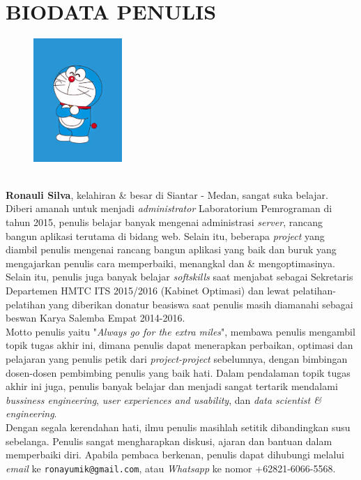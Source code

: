 \chapter{BIODATA PENULIS}
		\begin{figure}
			\includegraphics[width=0.3\textwidth]{images/foto-diri.jpg}
		\end{figure}
		\textbf{\ \\Ronauli Silva}, kelahiran \& besar di Siantar - Medan, sangat suka belajar. Diberi amanah untuk menjadi \textit{administrator} Laboratorium Pemrograman di tahun 2015, penulis belajar banyak mengenai administrasi \textit{server}, rancang bangun aplikasi terutama di bidang web. Selain itu, beberapa \textit{project} yang diambil penulis mengenai rancang bangun aplikasi yang baik dan buruk yang mengajarkan penulis cara memperbaiki, menangkal dan \& mengoptimasinya.\\
		Selain itu, penulis juga banyak belajar \textit{softskills} saat menjabat sebagai Sekretaris Departemen HMTC ITS 2015/2016 (Kabinet Optimasi) dan lewat pelatihan-pelatihan yang diberikan donatur beasiswa saat penulis masih diamanahi sebagai beswan Karya Salemba Empat 2014-2016.\\
		\indent Motto penulis yaitu "\textit{Always go for the extra miles}", membawa penulis mengambil topik tugas akhir ini, dimana penulis dapat menerapkan perbaikan, optimasi dan pelajaran yang penulis petik dari \textit{project-project} sebelumnya, dengan bimbingan dosen-dosen pembimbing penulis yang baik hati. Dalam pendalaman topik tugas akhir ini juga, penulis banyak belajar dan menjadi sangat tertarik mendalami \textit{bussiness engineering}, \textit{user experiences and usability}, dan \textit{data scientist \& engineering}. \\
		\indent Dengan segala kerendahan hati, ilmu penulis masihlah setitik dibandingkan susu sebelanga. Penulis sangat mengharapkan diskusi, ajaran dan bantuan dalam memperbaiki diri. Apabila pembaca berkenan, penulis dapat dihubungi melalui \textit{email} ke \texttt{ronayumik@gmail.com}, atau \textit{Whatsapp} ke nomor +62821-6066-5568.


